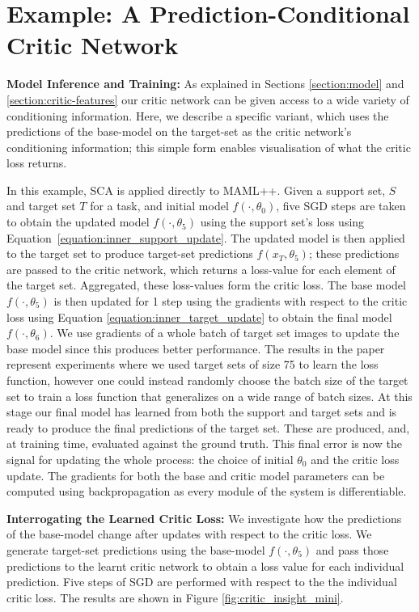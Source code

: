 \documentclass{article} \usepackage[dvipsnames]{xcolor}
\begin{document}
\section{Example: A Prediction-Conditional Critic Network}
\label{sect:example}
\textbf{Model Inference and Training:}
 As explained in Sections \ref{section:model} and \ref{section:critic-features} our critic network can be given access to a wide variety of conditioning information. Here, we describe a specific variant, which uses the predictions of the base-model on the target-set as the critic network's conditioning information; this simple form enables visualisation of what the critic loss returns. 
 
 In this example, SCA is applied directly to MAML++. Given a support set, $S$ and target set $T$ for a task, and initial model $f(\cdot,\theta_0)$, five SGD steps are taken to obtain the updated model $f(\cdot,\theta_{5})$ using the support set's loss using Equation~\ref{equation:inner_support_update}. The updated model is then applied to the target set to produce target-set predictions $f(x_T,\theta_5)$; these predictions are passed to the critic network, which returns a loss-value for each element of the target set. Aggregated, these loss-values form the critic loss. The base model $f(\cdot,\theta_5)$ is then updated for 1 step using the gradients with respect to the critic loss using Equation \ref{equation:inner_target_update} to obtain the final model $f(\cdot,\theta_6)$. We use gradients of a whole batch of target set images to update the base model since this produces better performance. The results in the paper represent experiments where we used target sets of size 75 to learn the loss function, however one could instead randomly choose the batch size of the target set to train a loss function that generalizes on a wide range of batch sizes.
At this stage our final model has learned from both the support and target sets and is ready to produce the final predictions of the target set. These are produced, and, at training time, evaluated against the ground truth. This final error is now the signal for updating the whole process: the choice of initial $\theta_0$ and the critic loss update. The gradients for both the base and critic model parameters can be computed using backpropagation as every module of the system is differentiable. 
 
\textbf{Interrogating the Learned Critic Loss:}
We investigate how the predictions of the base-model change after updates with respect to the critic loss. We generate target-set predictions using the base-model $f(\cdot,\theta_5)$ and pass those predictions to the learnt critic network to obtain a loss value for each individual prediction. Five steps of SGD are performed with respect to the the individual critic loss. The results are shown in Figure \ref{fig:critic_insight_mini}.
\end{document}
